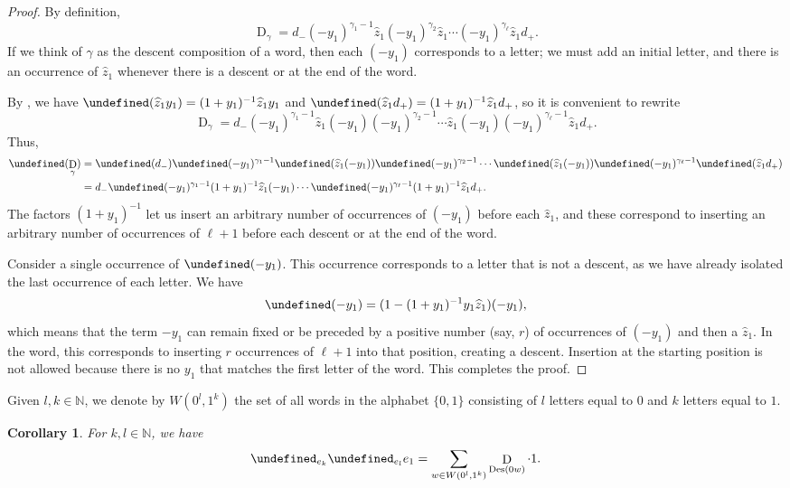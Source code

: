 \documentclass[reqno]{amsart}
\theoremstyle{plain}
\newtheorem{corollary}[theorem]{Corollary}
\theoremstyle{definition}
\theoremstyle{remark}
\DeclareMathOperator{\D}{D}
\DeclareMathOperator{\Des}{Des}
\newcommand{\z}{\widehat{z}}
\let\oldTheta\Theta
\let\Theta\undefined
\DeclareMathOperator{\Theta}{\oldTheta}
\newcommand{\<}{\langle}
\renewcommand{\>}{\rangle}
\begin{document}
\begin{proof}
    By definition, \[ \D_\gamma = d_- (-y_1)^{\gamma_1-1} \z_1 (-y_1)^{\gamma_2} \z_1 \cdots (-y_1)^{\gamma_\ell} \z_1 d_+. \]
    If we think of $\gamma$ as the descent composition of a word, then each $(-y_1)$ corresponds to a letter; we must add an initial letter, and there is an occurrence of $\z_1$ whenever there is a descent or at the end of the word.

    By , we have 
    $\Theta(\z_1 y_1) = (1+y_1)^{-1} \z_1 y_1$ and $\Theta(\z_1 d_+) = (1+y_1)^{-1} \z_1 d_+$, so it is convenient to rewrite
    \[ \D_\gamma = d_- (-y_1)^{\gamma_1-1} \z_1 (-y_1) (-y_1)^{\gamma_2-1} \cdots \z_1 (-y_1) (-y_1)^{\gamma_\ell-1} \z_1 d_+. \] Thus,
    \begin{align*} 
        \Theta (\D_\gamma) & =\Theta(d_-) \Theta(-y_1)^{\gamma_1-1} \Theta(\z_1 (-y_1)) \Theta(-y_1)^{\gamma_2-1} \cdots \Theta(\z_1 (-y_1)) \Theta(-y_1)^{\gamma_\ell-1} \Theta(\z_1 d_+) \\
        & = d_- \Theta(-y_1)^{\gamma_1-1} (1+y_1)^{-1} \z_1 (-y_1) \cdots \Theta(-y_1)^{\gamma_\ell-1} (1+y_1)^{-1} \z_1 d_+.
    \end{align*}
    The factors $(1+y_1)^{-1}$ let us insert an arbitrary number of occurrences of $(-y_1)$ before each $\z_1$, and these correspond to inserting an arbitrary number of occurrences of $\ell+1$ before each descent or at the end of the word.

    Consider a single occurrence of $\Theta(-y_1)$. This occurrence corresponds to a letter that is not a descent, as we have already isolated the last occurrence of each letter. We have
    \[ \Theta(-y_1) = (1 - (1 + y_1)^{-1} y_1 \z_1) (-y_1), \]
    which means that the term $-y_1$ can remain fixed or be preceded by a positive number (say, $r$) of occurrences of $(-y_1)$ and then a $\z_1$. In the word, this corresponds to inserting $r$ occurrences of $\ell+1$ into that position, creating a descent. Insertion at the starting position is not allowed because there is no $y_1$ that matches the first letter of the word. This completes the proof.
\end{proof}

Given $l,k \in \mathbb{N}$, we denote by $W\left(0^l,1^k\right)$ the set of all words in the alphabet $\{0,1\}$ consisting of $l$ letters equal to $0$ and $k$ letters equal to $1$.

\begin{corollary}
    \label{cor:theta_theta_e1}
    For $k, l \in \mathbb{N}$, we have
    \[ \Theta_{e_k} \Theta_{e_l} e_1 = \sum_{w\in W\left(0^l,1^k\right)} \D_{\Des(0w)} \cdot 1. \]
\end{corollary}
\end{document}
